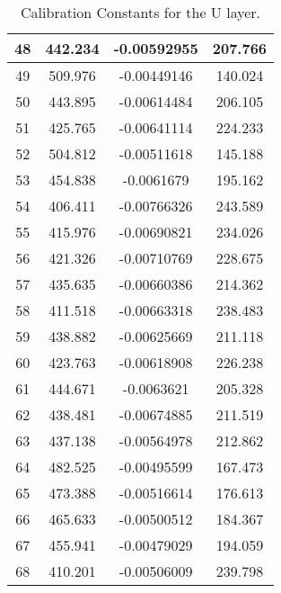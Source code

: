\begin{table}[h]
{\begin{tabular}{|c|c|c|c|}
48   &   442.234   &   -0.00592955   &   207.766  \\  \hline  
49   &   509.976   &   -0.00449146   &   140.024  \\  \hline  
50   &   443.895   &   -0.00614484   &   206.105  \\  \hline  
51   &   425.765   &   -0.00641114   &   224.233  \\  \hline  
52   &   504.812   &   -0.00511618   &   145.188  \\  \hline  
53   &   454.838   &   -0.0061679   &   195.162  \\  \hline  
54   &   406.411   &   -0.00766326   &   243.589  \\  \hline  
55   &   415.976   &   -0.00690821   &   234.026  \\  \hline  
56   &   421.326   &   -0.00710769   &   228.675  \\  \hline  
57   &   435.635   &   -0.00660386   &   214.362  \\  \hline  
58   &   411.518   &   -0.00663318   &   238.483  \\  \hline  
59   &   438.882   &   -0.00625669   &   211.118  \\  \hline  
60   &   423.763   &   -0.00618908   &   226.238  \\  \hline  
61   &   444.671   &   -0.0063621   &   205.328  \\  \hline  
62   &   438.481   &   -0.00674885   &   211.519  \\  \hline  
63   &   437.138   &   -0.00564978   &   212.862  \\  \hline  
64   &   482.525   &   -0.00495599   &   167.473  \\  \hline  
65   &   473.388   &   -0.00516614   &   176.613  \\  \hline  
66   &   465.633   &   -0.00500512   &   184.367  \\  \hline  
67   &   455.941   &   -0.00479029   &   194.059  \\  \hline  
68   &   410.201   &   -0.00506009   &   239.798  \\  \hline  
        \end{tabular}
        }
        \caption{Calibration Constants for the U layer.}
        \label{tab:UattenCSimulation}
\end{table}


